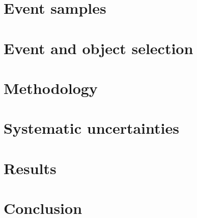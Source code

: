 \documentclass[NOTE, atlasdraft=true, texlive=2016, UKenglish]{\ATLASLATEXPATH atlasdoc}
\begin{document}
\maketitle

\tableofcontents


\clearpage


\section{Event samples}
\label{sec:samples}


\section{Event and object selection}
\label{sec:objects}

\newpage


\section{Methodology}
\label{sec:strategy}



\clearpage

\section{Systematic uncertainties}
\label{sec:uncerts}



\section{Results}
\label{sec:result}


\section{Conclusion}
\label{sec:conclusion}
\end{document}
